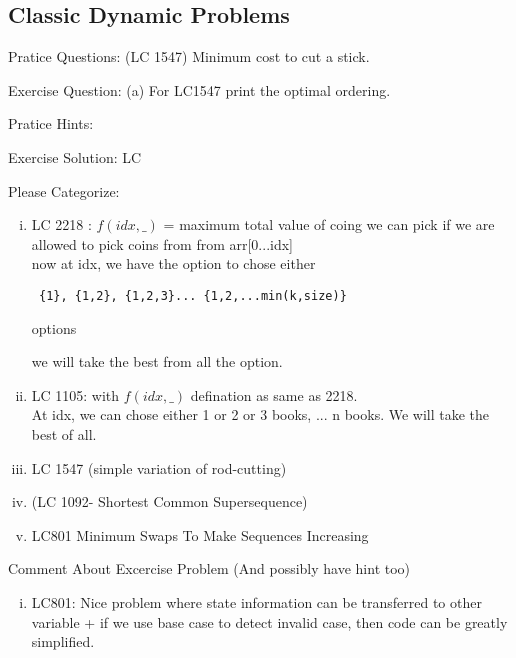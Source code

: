 \subsection{Classic Dynamic Problems}








\vspace{3cm}

Pratice Questions:
(LC 1547) Minimum cost to cut a stick.

Exercise Question:
(a) For LC1547 print the optimal ordering.

Pratice Hints:


Exercise Solution:
LC

Please Categorize:
\begin{enumerate}[(i)]
    \item 
     LC 2218 : $f(idx,\_)$ = maximum total value of coing we can pick if we are allowed to pick coins from from arr[0...idx]\\
     now at idx, we have the option to chose either \begin{verbatim} {1}, {1,2}, {1,2,3}... {1,2,...min(k,size)} \end{verbatim} options
        
     we will take the best from all the option.
    
     \item LC 1105: with $f(idx,\_)$ defination as same as 2218.\\
     At idx, we can chose either 1 or 2 or 3 books, ... n books. We will take the best of all.

     \item LC 1547 (simple variation of rod-cutting)
     \item (LC 1092- Shortest Common Supersequence)
     \item LC801 Minimum Swaps To Make Sequences Increasing 
\end{enumerate}

\vspace{5cm}
Comment About Excercise Problem (And possibly have hint too)
\begin{enumerate}[(i)]
    \item LC801: Nice problem where state information can be transferred to other variable + if we use base case to detect invalid case, then code can be greatly simplified.
\end{enumerate}
